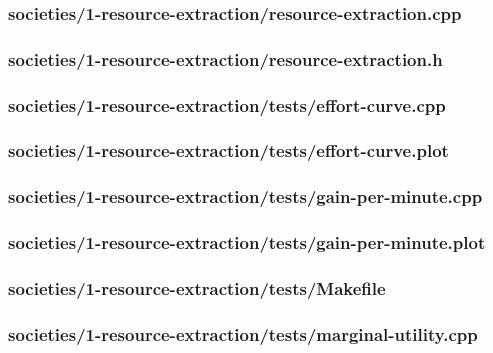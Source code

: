 \documentclass{article}
\begin{document}
\subsubsection*{societies/1-resource-extraction/resource-extraction.cpp}


\subsubsection*{societies/1-resource-extraction/resource-extraction.h}


\subsubsection*{societies/1-resource-extraction/tests/effort-curve.cpp}


\subsubsection*{societies/1-resource-extraction/tests/effort-curve.plot}


\subsubsection*{societies/1-resource-extraction/tests/gain-per-minute.cpp}


\subsubsection*{societies/1-resource-extraction/tests/gain-per-minute.plot}


\subsubsection*{societies/1-resource-extraction/tests/Makefile}


\subsubsection*{societies/1-resource-extraction/tests/marginal-utility.cpp}

\end{document}
